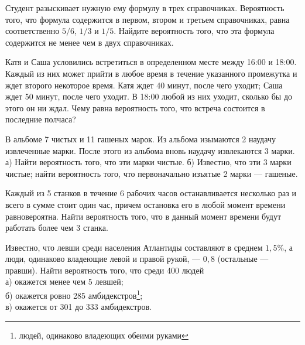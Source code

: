 \documentclass[12pt,a4paper,%
]{scrartcl}
\begin{document}
\vfill\newpage\setcounter{zad}{0}






\begin{zkrW}{20}\noindent Студент разыскивает нужную ему формулу в трех справочниках. Вероятность того, что формула содержится в первом, втором и третьем справочниках, равна соответственно $5/6$, $1/3$ и $1/5$. Найдите вероятность того, что эта формула содержится не менее чем в двух справочниках.
 \end{zkrW}

\vfill


\begin{zkrW}{20}\noindent Катя и Саша условились встретиться в определенном месте между 16:00 и 18:00. Каждый из них может прийти в любое время в течение указанного промежутка и ждет второго некоторое время. Катя ждет 40 минут, после чего уходит; Саша ждет 50 минут, после чего уходит. В 18:00 любой из них уходит, сколько бы до этого он ни ждал. Чему равна вероятность того, что встреча состоится в последние полчаса?
 \end{zkrW}

\vfill


\begin{zkrW}{20}\noindent В альбоме 7 чистых и 11 гашеных марок. Из альбома изымаются 2 наудачу извлеченные марки. После этого из альбома вновь наудачу извлекаются 3 марки. а) Найти вероятность того, что эти марки чистые. б) Известно, что эти 3 марки чистые; найти вероятность того, что первоначально изъятые 2 марки --- гашеные.
 \end{zkrW}

\vfill



\begin{zkrW}{20}\noindent Каждый из 5 станков в течение 6 рабочих часов останавливается несколько раз и всего в сумме стоит один час, причем остановка его в любой момент времени равновероятна. Найти вероятность того, что в данный момент времени будут работать более чем 3 станка.
 \end{zkrW}

\vfill



\begin{zkrW}{20}\noindent Известно, что левши среди населения Атлантиды составляют в среднем $1{,}5\%$, а люди, одинаково владеющие левой и правой рукой, --- $0{,}8$ (остальные --- правши). Найти вероятность того, что среди 400 людей \\ \indent а) окажется менее чем 5 левшей; \\ \indent б) окажется ровно 285 амбидекстров\footnote{людей, одинаково владеющих обеими руками}; \\ \indent в) окажется от 301 до 333 амбидекстров.
 \end{zkrW}
\end{document}
